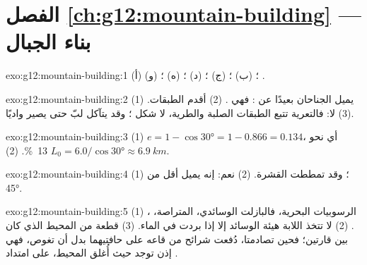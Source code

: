 \section*{الفصل \ref{ch:g12:mountain-building} --- بناء الجبال}

\begin{solution}{exo:g12:mountain-building:1}
(أ) ؛ (ب) ؛ (ج) ؛ (د) ؛ (ه) ؛
(و) .
\end{solution}

\begin{solution}{exo:g12:mountain-building:2}
(1) يميل الجناحان بعيدًا عن : فهي . (2) أقدم
الطبقات. (3) لا: فالتعرية تتبع الطبقات الصلبة والطرية، لا شكل
؛ وقد يتآكل لبّ  حتى يصير واديًا.
\end{solution}

\begin{solution}{exo:g12:mountain-building:3}
(1) $e = 1 - \cos\ang{30} = 1 - 0.866 = 0.134$، أي نحو \qty{13}{\percent}.
(2) $L_0 = 6.0/\cos\ang{30} \approx \qty{6.9}{km}$.
\end{solution}

\begin{solution}{exo:g12:mountain-building:4}
(1) ؛ وقد تمططت القشرة. (2) نعم: إنه 
يميل أقل من \ang{45}.
\end{solution}

\begin{solution}{exo:g12:mountain-building:5}
(1) الرسوبيات البحرية، فالبازلت الوسائدي،  المتراصة، ، .
(2) لا تتخذ اللابة هيئة الوسائد إلا إذا بردت في الماء. (3) 
قطعة من المحيط الذي كان بين قارتين؛ فحين تصادمتا،
دُفعت شرائح من قاعه على حافتيهما بدل أن تغوص، فهي إذن
توجد حيث أُغلق المحيط، على امتداد .
\end{solution}

